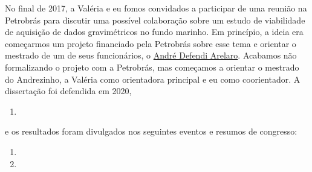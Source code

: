 \noindent No final de 2017, a Valéria e eu fomos convidados a participar de uma reunião
na Petrobrás para discutir uma possível colaboração sobre um estudo de viabilidade de
aquisição de dados gravimétricos no fundo marinho. Em princípio, a ideia era começarmos 
um projeto financiado pela Petrobrás sobre esse tema e orientar o mestrado de um de seus
funcionários, o \href{https://lattes.cnpq.br/9144077841390825}{André Defendi Arelaro}.
Acabamos não formalizando o projeto com a Petrobrás, mas começamos a orientar o
mestrado do Andrezinho, a Valéria como orientadora principal e eu como coorientador.
A dissertação foi defendida em 2020,
\begin{enumerate}
	\item{}
\end{enumerate}
e os resultados foram divulgados nos seguintes eventos e resumos de congresso:
\begin{enumerate}
	\item {}
	\item {}
\end{enumerate}
